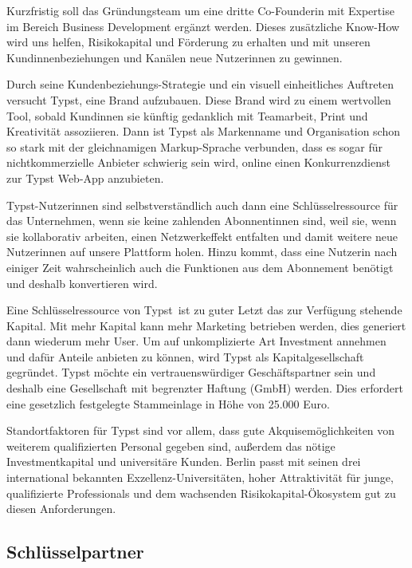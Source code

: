 \documentclass[11pt, a4paper]{article}
\newcommand{\gender}{\raisebox{-.25em}{*}}
\begin{document}
Kurzfristig soll das Gründungsteam um eine\gender{} dritte\gender{} Co-Founder\gender{}in mit Expertise im Bereich Business Development ergänzt werden. Dieses zusätzliche Know-How wird uns helfen, Risikokapital und Förderung zu erhalten und mit unseren Kund\gender{}innenbeziehungen und Kanälen neue Nutzer\gender{}innen zu gewinnen. 

Durch seine Kundenbeziehungs-Strategie und ein visuell einheitliches Auftreten versucht Typst, eine Brand aufzubauen. Diese Brand wird zu einem wertvollen Tool, sobald Kund\gender{}innen sie künftig gedanklich mit Teamarbeit, Print und Kreativität assoziieren. Dann ist Typst als Markenname und Organisation schon so stark mit der gleichnamigen Markup-Sprache verbunden, dass es sogar für nichtkommerzielle Anbieter schwierig sein wird, online einen Konkurrenzdienst zur Typst Web-App anzubieten.

Typst-Nutzer\gender{}innen sind selbstverständlich auch dann eine Schlüsselressource für das Unternehmen, wenn sie keine zahlenden Abonnent\gender{}innen sind, weil sie, wenn sie kollaborativ arbeiten, einen Netzwerkeffekt entfalten und damit weitere neue Nutzer\gender{}innen auf unsere Plattform holen. Hinzu kommt, dass ein\gender{}e Nutzer\gender{}in nach einiger Zeit wahrscheinlich auch die Funktionen aus dem Abonnement benötigt und deshalb konvertieren wird.

Eine Schlüsselressource von Typst ist zu guter Letzt das zur Verfügung stehende Kapital. Mit mehr Kapital kann mehr Marketing betrieben werden, dies generiert dann wiederum mehr User. Um auf unkomplizierte Art Investment annehmen und dafür Anteile anbieten zu können, wird Typst als Kapitalgesellschaft gegründet. Typst möchte ein vertrauenswürdiger Geschäftspartner sein und deshalb eine Gesellschaft mit begrenzter Haftung (GmbH) werden. Dies erfordert eine gesetzlich festgelegte Stammeinlage in Höhe von 25.000 Euro.

Standortfaktoren für Typst sind vor allem, dass gute Akquisemöglichkeiten von weiterem qualifizierten Personal gegeben sind, außerdem das nötige Investmentkapital und universitäre Kunden. Berlin passt mit seinen drei international bekannten Exzellenz-Universitäten, hoher Attraktivität für junge, qualifizierte Professionals und dem wachsenden Risikokapital-Ökosystem gut zu diesen Anforderungen.


\newpage
\subsection*{Schlüsselpartner}
\end{document}
